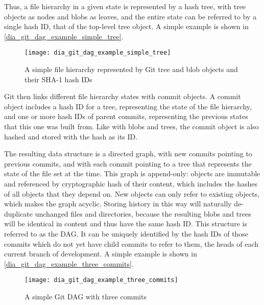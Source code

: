Thus, a file hierarchy in a given state is represented by a hash tree, with
\gls{tree} objects as nodes and \glspl{blob} as leaves, and the entire state can
be referred to by a single hash ID, that of the top-level \gls{tree} object. A
simple example is shown in \autoref{dia_git_dag_example_simple_tree}.

\begin{figure}[h]
    \centering
    \texttt{[image: dia\_git\_dag\_example\_simple\_tree]}
    \caption{A simple file hierarchy represented by Git tree and blob objects
    and their SHA-1 hash IDs}
    \label{dia_git_dag_example_simple_tree}
\end{figure}

Git then links different file hierarchy states with \gls{commit} objects. A
\gls{commit} object includes a hash ID for a \gls{tree}, representing the state
of the file hierarchy, and one or more hash IDs of parent \glspl{commit},
representing the previous states that this one was built from. Like with
\glspl{blob} and \glspl{tree}, the \gls{commit} object is also hashed and stored
with the hash as its ID.

The resulting data structure is a directed graph, with new \glspl{commit}
pointing to previous \glspl{commit}, and with each \gls{commit} pointing to a
\gls{tree} that represents the state of the file set at the time. This graph is
append-only: objects are immutable and referenced by cryptographic hash of their
content, which includes the hashes of all objects that they depend on. New
objects can only refer to existing objects, which makes the graph acyclic.
Storing history in this way will naturally de-duplicate unchanged files and
directories, because the resulting \glspl{blob} and \glspl{tree} will be
identical in content and thus have the same hash ID. This
 structure is referred to as the
\acrshort{DAG}. It can be uniquely identified by the hash IDs of
those \glspl{commit} which do not yet have child \glspl{commit} to refer to
them, the \glspl{head} of each current \gls{branch} of development. A simple
example is shown in \autoref{dia_git_dag_example_three_commits}.

\begin{figure}[p]
    \centering
    \texttt{[image: dia\_git\_dag\_example\_three\_commits]}
    \caption{A simple Git DAG with three commits}
    \label{dia_git_dag_example_three_commits}
\end{figure}

